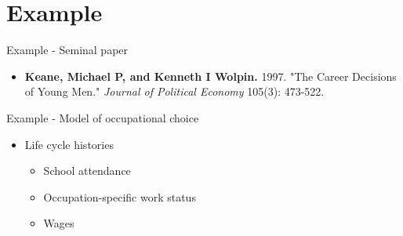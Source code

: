 \section{Example}
\begin{frame}{Example - Seminal paper}
\begin{itemize}
\item \textbf{Keane, Michael P, and Kenneth I Wolpin.} 1997. "The Career Decisions of Young Men." \textit{Journal of Political Economy} 105(3): 473-522.
\nocite{Keane.1997}
\end{itemize}
\end{frame}
\begin{frame}{Example - Model of occupational choice}

\begin{itemize}\setlength\itemsep{1em}
\item Life cycle histories \medskip
\begin{itemize}\setlength\itemsep{1em}
\item School attendance
\item Occupation-specific work status
\item Wages
\end{itemize}
\end{itemize}
\end{frame}


